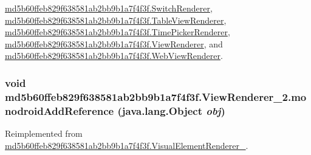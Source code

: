 \hyperlink{classmd5b60ffeb829f638581ab2bb9b1a7f4f3f_1_1_switch_renderer_e710661b76463c9bcf3e5aa5ae37d860}{md5b60ffeb829f638581ab2bb9b1a7f4f3f.SwitchRenderer}, \hyperlink{classmd5b60ffeb829f638581ab2bb9b1a7f4f3f_1_1_table_view_renderer_9a8e5ca95f8d81d63f025a408f8d84c0}{md5b60ffeb829f638581ab2bb9b1a7f4f3f.TableViewRenderer}, \hyperlink{classmd5b60ffeb829f638581ab2bb9b1a7f4f3f_1_1_time_picker_renderer_a537d43fd640e0635d2def19652ab0be}{md5b60ffeb829f638581ab2bb9b1a7f4f3f.TimePickerRenderer}, \hyperlink{classmd5b60ffeb829f638581ab2bb9b1a7f4f3f_1_1_view_renderer_ec3c17e00fab196999735579e51f409f}{md5b60ffeb829f638581ab2bb9b1a7f4f3f.ViewRenderer}, and \hyperlink{classmd5b60ffeb829f638581ab2bb9b1a7f4f3f_1_1_web_view_renderer_104d56fcab06d47e41f1c827759281d5}{md5b60ffeb829f638581ab2bb9b1a7f4f3f.WebViewRenderer}.\hypertarget{classmd5b60ffeb829f638581ab2bb9b1a7f4f3f_1_1_view_renderer__2_64ca8244a89f60a47c173d9c0b15d610}{
\subsubsection[{monodroidAddReference}]{\setlength{\rightskip}{0pt plus 5cm}void md5b60ffeb829f638581ab2bb9b1a7f4f3f.ViewRenderer\_\-2.monodroidAddReference (java.lang.Object {\em obj})}}
\label{classmd5b60ffeb829f638581ab2bb9b1a7f4f3f_1_1_view_renderer__2_64ca8244a89f60a47c173d9c0b15d610}




Reimplemented from \hyperlink{classmd5b60ffeb829f638581ab2bb9b1a7f4f3f_1_1_visual_element_renderer__1_321b2967faff34b0f7971f55915f583e}{md5b60ffeb829f638581ab2bb9b1a7f4f3f.VisualElementRenderer\_}.

